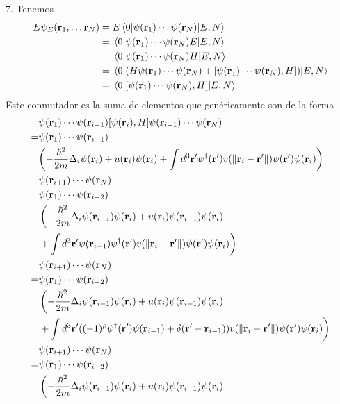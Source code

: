 \documentclass{article}
\begin{document}
7. Tenemos
\begin{align}
\begin{split}
E\psi_E(\vb{r}_1,\dots\vb{r}_N)&=E\mel{0}{\psi(\vb{r}_1)\cdots\psi(\vb{r}_N)}{E,N}\\
&=\mel{0}{\psi(\vb{r}_1)\cdots\psi(\vb{r}_N)E}{E,N}\\
&=\mel{0}{\psi(\vb{r}_1)\cdots\psi(\vb{r}_N)H}{E,N}\\
&=\mel{0}{\qty(H\psi(\vb{r}_1)\cdots\psi(\vb{r}_N)+[\psi(\vb{r}_1)\cdots\psi(\vb{r}_N),H])}{E,N}\\
&=\mel{0}{[\psi(\vb{r}_1)\cdots\psi(\vb{r}_N),H]}{E,N}\\
\end{split}
\end{align}
Este conmutador es la suma de elementos que genéricamente son de la forma
\begin{align}
\begin{split}
&\psi(\vb{r}_1)\cdots\psi(\vb{r}_{i-1})[\psi(\vb{r}_i),H]\psi(\vb{r}_{i+1})\cdots\psi(\vb{r}_N)\\
=&\psi(\vb{r}_1)\cdots\psi(\vb{r}_{i-1})\\
&\qty(-\frac{\hbar^2}{2m}\Delta_i\psi(\vb{r}_i)+u(\vb{r}_i)\psi(\vb{r}_i)+\int d^3\vb{r}'\psi^\dagger(\vb{r}')v(\|\vb{r}_i-\vb{r}'\|)\psi(\vb{r}')\psi(\vb{r}_i))\\
&\psi(\vb{r}_{i+1})\cdots\psi(\vb{r}_N)\\
=&\psi(\vb{r}_1)\cdots\psi(\vb{r}_{i-2})\\
&\left(- \frac{\hbar^2}{2m}\Delta_i\psi(\vb{r}_{i-1})\psi(\vb{r}_i)+ u(\vb{r}_i)\psi(\vb{r}_{i-1})\psi(\vb{r}_i)\right.\\
&\left.+\int d^3\vb{r}'\psi(\vb{r}_{i-1})\psi^\dagger(\vb{r}')v(\|\vb{r}_i-\vb{r}'\|)\psi(\vb{r}')\psi(\vb{r}_i)\right)\\
&\psi(\vb{r}_{i+1})\cdots\psi(\vb{r}_N)\\
=&\psi(\vb{r}_1)\cdots\psi(\vb{r}_{i-2})\\
&\left(- \frac{\hbar^2}{2m}\Delta_i\psi(\vb{r}_{i-1})\psi(\vb{r}_i)+ u(\vb{r}_i)\psi(\vb{r}_{i-1})\psi(\vb{r}_i)\right.\\
&\left.+\int d^3\vb{r}'((-1)^\rho \psi^\dagger(\vb{r}')\psi(\vb{r}_{i-1})+\delta(\vb{r}'-\vb{r}_{i-1}))v(\|\vb{r}_i-\vb{r}'\|)\psi(\vb{r}')\psi(\vb{r}_i)\right)\\
&\psi(\vb{r}_{i+1})\cdots\psi(\vb{r}_N)\\
=&\psi(\vb{r}_1)\cdots\psi(\vb{r}_{i-2})\\
&\left(- \frac{\hbar^2}{2m}\Delta_i\psi(\vb{r}_{i-1})\psi(\vb{r}_i)+ u(\vb{r}_i)\psi(\vb{r}_{i-1})\psi(\vb{r}_i)\right.\\

\end{split}
\end{align}
\end{document}
